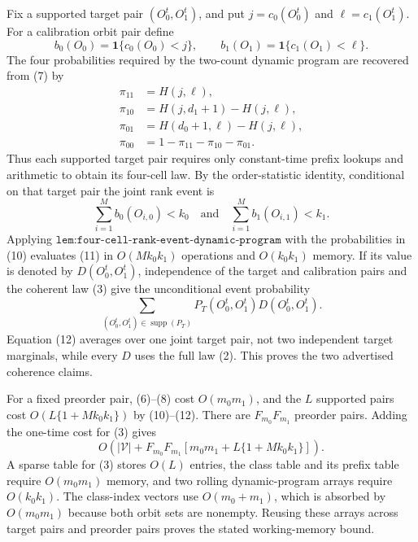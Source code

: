 Fix a supported target pair \((O_0^t,O_1^t)\), and put \(j=c_0(O_0^t)\) and \(\ell=c_1(O_1^t)\). For a calibration orbit pair define
\[
b_0(O_0)=\mathbf 1\{c_0(O_0)<j\},\qquad b_1(O_1)=\mathbf 1\{c_1(O_1)<\ell\}.
\tag{9}
\]
The four probabilities required by the two-count dynamic program are recovered from (7) by
\[
\begin{aligned}
\pi_{11}&=H(j,\ell),\\
\pi_{10}&=H(j,d_1+1)-H(j,\ell),\\
\pi_{01}&=H(d_0+1,\ell)-H(j,\ell),\\
\pi_{00}&=1-\pi_{11}-\pi_{10}-\pi_{01}.
\end{aligned}
\tag{10}
\]
Thus each supported target pair requires only constant-time prefix lookups and arithmetic to obtain its four-cell law. By the order-statistic identity, conditional on that target pair the joint rank event is
\[
\sum_{i=1}^M b_0(O_{i,0})<k_0\quad\text{and}\quad\sum_{i=1}^M b_1(O_{i,1})<k_1.
\tag{11}
\]
Applying \(\texttt{lem:four-cell-rank-event-dynamic-program}\) with the probabilities in (10) evaluates (11) in \(O(Mk_0k_1)\) operations and \(O(k_0k_1)\) memory. If its value is denoted by \(D(O_0^t,O_1^t)\), independence of the target and calibration pairs and the coherent law (3) give the unconditional event probability
\[
\sum_{(O_0^t,O_1^t)\in\operatorname{supp}(P_T)}P_T(O_0^t,O_1^t)D(O_0^t,O_1^t).
\tag{12}
\]
Equation (12) averages over one joint target pair, not two independent target marginals, while every \(D\) uses the full law (2). This proves the two advertised coherence claims.

For a fixed preorder pair, (6)--(8) cost \(O(m_0m_1)\), and the \(L\) supported pairs cost \(O(L\{1+Mk_0k_1\})\) by (10)--(12). There are \(F_{m_0}F_{m_1}\) preorder pairs. Adding the one-time cost for (3) gives
\[
O\!\left(|\mathcal V|+F_{m_0}F_{m_1}\left[m_0m_1+L\{1+Mk_0k_1\}\right]\right).
\tag{13}
\]
A sparse table for (3) stores \(O(L)\) entries, the class table and its prefix table require \(O(m_0m_1)\) memory, and two rolling dynamic-program arrays require \(O(k_0k_1)\). The class-index vectors use \(O(m_0+m_1)\), which is absorbed by \(O(m_0m_1)\) because both orbit sets are nonempty. Reusing these arrays across target pairs and preorder pairs proves the stated working-memory bound.